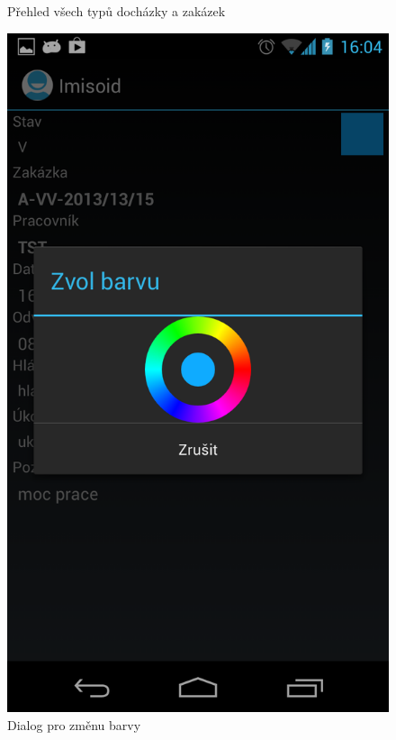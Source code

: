 \documentclass{diplomka}
\begin{document}
\begin{figure}[H]
\begin{minipage}{.45\textwidth}
   \caption{Přehled všech typů docházky a zakázek}
  \label{fig:colors}
\end{minipage}\hfill%
\begin{minipage}{.45\textwidth}
   \centering
 \includegraphics[width=.9\linewidth]{scr/changecolor.png}
   \caption{Dialog pro změnu barvy}
  \label{fig:changecolor}
\end{minipage}
\end{figure}
\end{document}
